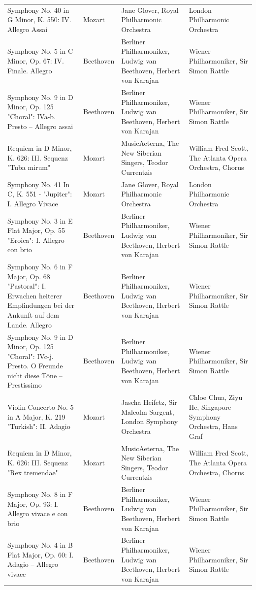 \begin{longtable}{p{} p{} p{} p{}}
Symphony No. 40 in G Minor, K. 550: IV. Allegro Assai & Mozart & Jane Glover, Royal Philharmonic Orchestra & London Philharmonic Orchestra \\
Symphony No. 5 in C Minor, Op. 67: IV. Finale. Allegro & Beethoven & Berliner Philharmoniker, Ludwig van Beethoven, Herbert von Karajan & Wiener Philharmoniker, Sir Simon Rattle \\
Symphony No. 9 in D Minor, Op. 125 "Choral": IVa-b. Presto – Allegro assai & Beethoven & Berliner Philharmoniker, Ludwig van Beethoven, Herbert von Karajan & Wiener Philharmoniker, Sir Simon Rattle \\
Requiem in D Minor, K. 626: III. Sequenz "Tuba mirum" & Mozart & MusicAeterna, The New Siberian Singers, Teodor Currentzis & William Fred Scott, The Atlanta Opera Orchestra, Chorus \\
Symphony No. 41 In C, K. 551 - "Jupiter": I. Allegro Vivace & Mozart & Jane Glover, Royal Philharmonic Orchestra & London Philharmonic Orchestra \\
Symphony No. 3 in E Flat Major, Op. 55 "Eroica": I. Allegro con brio & Beethoven & Berliner Philharmoniker, Ludwig van Beethoven, Herbert von Karajan & Wiener Philharmoniker, Sir Simon Rattle \\
Symphony No. 6 in F Major, Op. 68 "Pastoral": I. Erwachen heiterer Empfindungen bei der Ankunft auf dem Lande. Allegro & Beethoven & Berliner Philharmoniker, Ludwig van Beethoven, Herbert von Karajan & Wiener Philharmoniker, Sir Simon Rattle \\
Symphony No. 9 in D Minor, Op. 125 "Choral": IVc-j. Presto. O Freunde nicht diese Töne – Prestissimo & Beethoven & Berliner Philharmoniker, Ludwig van Beethoven, Herbert von Karajan & Wiener Philharmoniker, Sir Simon Rattle \\
Violin Concerto No. 5 in A Major, K. 219 "Turkish": II. Adagio & Mozart & Jascha Heifetz, Sir Malcolm Sargent, London Symphony Orchestra & Chloe Chua, Ziyu He, Singapore Symphony Orchestra, Hans Graf \\
Requiem in D Minor, K. 626: III. Sequenz "Rex tremendae" & Mozart & MusicAeterna, The New Siberian Singers, Teodor Currentzis & William Fred Scott, The Atlanta Opera Orchestra, Chorus \\
Symphony No. 8 in F Major, Op. 93: I. Allegro vivace e con brio & Beethoven & Berliner Philharmoniker, Ludwig van Beethoven, Herbert von Karajan & Wiener Philharmoniker, Sir Simon Rattle \\
Symphony No. 4 in B Flat Major, Op. 60: I. Adagio – Allegro vivace & Beethoven & Berliner Philharmoniker, Ludwig van Beethoven, Herbert von Karajan & Wiener Philharmoniker, Sir Simon Rattle \\

\end{longtable}
